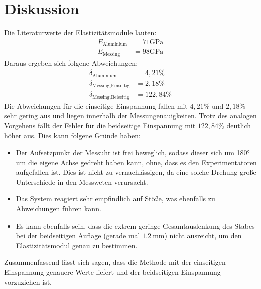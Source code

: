 \section{Diskussion}
Die Literaturwerte\cite[95]{elast} der Elastizitätsmodule lauten:
\begin{align*}
  E_\text{Aluminium} &= 71 \si{\giga\pascal} \\
  E_\text{Messing} &= 98 \si{\giga\pascal}
\end{align*}
Daraus ergeben sich folgene Abweichungen:
\begin{align*}
\delta_\text{Aluminium} &= 4,21\%\\
\delta_\text{Messing,Einseitig} &= 2,18\%\\
\delta_\text{Messing,Beiseitig} &= 122,84\% %
\end{align*}
Die Abweichungen für die einseitige Einspannung fallen mit $4,21\%$ und $2,18\%$ sehr gering aus und liegen innerhalb
der Messungenauigkeiten.
Trotz des analogen Vorgehens fällt der Fehler für die beidseitige Einspannung mit $122,84\%$ deutlich höher aus.
Dies kann folgene Gründe haben:
\begin{itemize}
  \item Der Aufsetzpunkt der Messuhr ist frei beweglich, sodass dieser sich um 180° um die eigene Achse gedreht haben kann,
  ohne, dass es den Experimentatoren aufgefallen ist.
  Dies ist nicht zu vernachlässigen, da eine solche Drehung große Unterschiede in den Messweten verursacht.
  \item Das System reagiert sehr empfindlich auf Stöße, was ebenfalls zu Abweichungen führen kann.
  \item Es kann ebenfalls sein,
  dass die extrem geringe Gesamtauslenkung des Stabes bei der beidseitigen Auflage (gerade mal $\SI{1,2}{\mm}$)
  nicht ausreicht, um den Elastizitätsmodul genau zu bestimmen.
\end{itemize}

Zusammenfassend lässt sich sagen, dass die Methode mit der einseitigen Einspannung genauere Werte liefert
und der beidseitigen Einspannung vorzuziehen ist.
